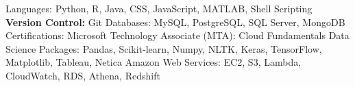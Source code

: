 \vspace{-2mm}
\begin{cvhonors}
  \cvhonor
    {Languages:}
    {Python, R, Java, CSS, JavaScript, MATLAB, Shell Scripting {\hspace{21mm}} \textbf{ Version Control:} Git}
    {}
    {}
  \cvhonor
    {Databases:}
    {MySQL, PostgreSQL, SQL Server, MongoDB}
    {}
    {}
    \cvhonor
    {Certifications:}
    {Microsoft Technology Associate (MTA): Cloud Fundamentals }
    {}
    {}
    \cvhonor
    {Data Science Packages:}
    {Pandas, Scikit-learn, Numpy, NLTK, Keras, TensorFlow, Matplotlib, Tableau, Netica}
    {}
    {}
    \cvhonor
    {Amazon Web Services:}
    {EC2, S3, Lambda, CloudWatch, RDS, Athena, Redshift}
    {}
    {}
\end{cvhonors}